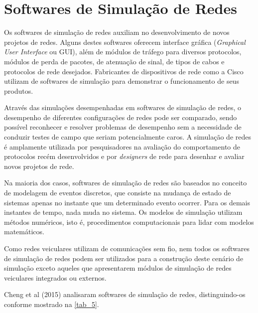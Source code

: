 \documentclass[
12pt,				%
openright,			%
oneside,			%
a4paper,			%
brazil,				%
]{abntex2}
\begin{document}
	\section{Softwares de Simulação de Redes}
	
	\par Os softwares de simulação de redes auxiliam no desenvolvimento de novos projetos de redes. Alguns destes softwares oferecem interface gráfica  (\textit{Graphical User Interface} ou  GUI), além de módulos de tráfego para diversos protocolos, módulos de perda de pacotes, de atenuação de sinal, de tipos de cabos e protocolos de rede desejados. Fabricantes de dispositivos de rede como a Cisco utilizam de softwares de simulação para demonstrar o funcionamento de seus produtos.
	
	\par Através das simulações desempenhadas em softwares de simulação de redes, o desempenho de diferentes configurações de redes pode ser comparado, sendo possível reconhecer e resolver problemas de desempenho sem a necessidade de conduzir testes de campo que seriam potencialmente caros. A simulação de redes é amplamente utilizada por pesquisadores na avaliação do comportamento de protocolos recém desenvolvidos e por \textit{designers} de rede para desenhar e avaliar novos projetos de rede.

	\par Na maioria dos casos, softwares de simulação de redes são baseados no conceito de modelagem de eventos discretos, que consiste na mudança de estado de sistemas apenas no instante que um determinado evento ocorrer. Para os demais instantes de tempo, nada muda no sistema. Os modelos de simulação utilizam métodos numéricos, isto é, procedimentos computacionais para lidar com modelos matemáticos.
	
	\par Como redes veiculares utilizam de comunicações sem fio, nem todos os softwares de simulação de redes podem ser utilizados para a construção deste cenário de simulação exceto aqueles que apresentarem módulos de simulação de redes veiculares integrados ou externos.
	
	\par Cheng et al (2015) analisaram softwares de simulação de redes, distinguindo-os conforme mostrado na \autoref{tab_5}. 
	
\end{document}
